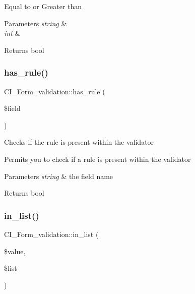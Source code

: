 Equal to or Greater than


\begin{DoxyParams}{Parameters}
{\em string} & \\
\hline
{\em int} & \\
\hline
\end{DoxyParams}
\begin{DoxyReturn}{Returns}
bool 
\end{DoxyReturn}
\mbox{\label{class_c_i___form__validation_a1c8af1469a64e046b174a011bf30cc13}} 
\subsubsection{\texorpdfstring{has\+\_\+rule()}{has\_rule()}}
{\footnotesize\ttfamily C\+I\+\_\+\+Form\+\_\+validation\+::has\+\_\+rule (\begin{DoxyParamCaption}\item[{}]{\$field }\end{DoxyParamCaption})}

Checks if the rule is present within the validator

Permits you to check if a rule is present within the validator


\begin{DoxyParams}{Parameters}
{\em string} & the field name \\
\hline
\end{DoxyParams}
\begin{DoxyReturn}{Returns}
bool 
\end{DoxyReturn}
\mbox{\label{class_c_i___form__validation_a20bbfa76a5f1f526be8dab27db6f04f8}} 
\subsubsection{\texorpdfstring{in\+\_\+list()}{in\_list()}}
{\footnotesize\ttfamily C\+I\+\_\+\+Form\+\_\+validation\+::in\+\_\+list (\begin{DoxyParamCaption}\item[{}]{\$value,  }\item[{}]{\$list }\end{DoxyParamCaption})}

